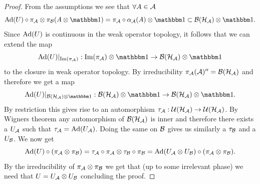 \documentclass[12pt,a4paper,twoside]{article}
\numberwithin{equation}{section}
\begin{document}
\begin{proof}
From the assumptions we see that $\forall A\in\AA$
\begin{equation}
	\Ad{U}\circ\pi_\AA\otimes\pi_\BB(A\otimes\id)=\pi_\AA\circ\alpha_\AA(A)\otimes\id\subset \BB(\HH_\AA)\otimes\id.
\end{equation}
Since $\Ad{U}$ is continuous in the weak operator topology, it follows that we can extend the map
\begin{equation}
	\Ad{U}|_{\textrm{Im}(\pi_\AA)}:\textrm{Im}(\pi_\AA)\otimes\id\rightarrow \BB(\HH_\AA)\otimes\id
\end{equation}
to the closure in weak operator topology. By irreducibility $\pi_\AA(\AA)''=\BB(\HH_\AA)$ and therefore we get a map
\begin{equation}
	\Ad{U}|_{\BB(\HH_\AA)\otimes\id}:\BB(\HH_\AA)\otimes\id\rightarrow \BB(\HH_\AA)\otimes\id.
\end{equation}
By restriction this gives rise to an automorphism $\tau_\AA:\UU(\HH_\AA)\rightarrow\UU(\HH_\AA)$. By Wigners theorem any automorphism of $\BB(\HH_\AA)$ is inner and therefore there exists a $U_\AA$ such that $\tau_\AA=\Ad{U_\AA}$. Doing the same on $\BB$ gives us similarly a $\tau_\BB$ and a $U_\BB$. We now get
\begin{equation}
	\Ad{U}\circ(\pi_\AA\otimes\pi_\BB)=\tau_\AA\circ\pi_\AA\otimes\tau_\BB\circ\pi_\BB=\Ad{U_\AA\otimes U_\BB}\circ(\pi_\AA\otimes\pi_\BB).
\end{equation}
By the irreducibility of $\pi_\AA\otimes\pi_\BB$ we get that (up to some irrelevant phase) we need that $U=U_\AA\otimes U_\BB$ concluding the proof.
\end{proof}
\end{document}
